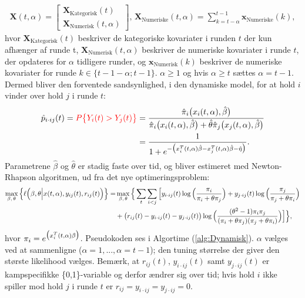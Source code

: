 \documentclass[11pt,a4paper]{article}
\begin{document}
\begin{align*}
\textbf{X}(t,\alpha)=\begin{bmatrix}
\textbf{X}_{\text{Kategorisk}}(t)\\
\textbf{X}_{\text{Numerisk}}(t,\alpha)
\end{bmatrix}\text{,   }\textbf{X}_{\text{Numeriske}}(t,\alpha)=\sum_{k=t-\alpha}^{t-1}\textbf{x}_{\text{Numeriske}}(k),
\end{align*}
hvor $\textbf{X}_{\text{Kategorisk}}(t)$ beskriver de kategoriske kovariater i runden $t$ der kun afhænger af runde t, $\textbf{X}_{\text{Numerisk}}(t,\alpha)$ beskriver de numeriske kovariater i runde $t$, der opdateres for $\alpha$ tidligere runder, og $\textbf{x}_{\text{Numerisk}}(k)$ beskriver de numeriske kovariater for runde $k\in \{t-1-\alpha;t-1\}$. $\alpha\geq1$ og hvis $\alpha\geq t$ sættes $\alpha=t-1$.
Dermed bliver den forventede sandsynlighed, i den dynamiske model, for at hold $i$ vinder over hold $j$ i runde $t$:
\begin{align*}
\hat{p}_{i\cdot ij}(t)=\textcolor{red}{P\big{\{}Y_{i}(t)>Y_{j}(t)\big{\}}}&=\frac{\hat{\pi}_i\big{(}x_i(t,\alpha),\hat{\beta}\big{)}}{\hat{\pi}_i\big{(}x_i(t,\alpha),\hat{\beta}\big{)}+\hat{\theta}\hat{\pi}_j\big{(}x_j(t,\alpha),\hat{\beta}\big{)}}\\
&=\frac{1}{1+e^{-\big{(}x_i^T(t,\alpha)\hat{\beta}-x_j^T(t,\alpha)\hat{\beta}-\hat{\eta}\big{)}}}.
\end{align*}
Parametrene $\hat{\beta}$ og $\hat{\theta}$ er stadig faste over tid, og bliver estimeret med Newton-Rhapson algoritmen, ud fra det nye optimeringsproblem:
\begin{align*}
\max_{\beta,\,\theta} \Big{\{}\ell\Big{(}\beta,\theta\Big{|}x(t,\alpha),y_{ij}(t),r_{ij}(t)\Big{)}\Big{\}}=&\max_{\beta,\,\theta} \Big{\{} \sum_{t}\sum_{i<j}\Big{[}y_{i\cdot ij}(t)\log\Big{(}\frac{\pi_i}{\pi_i+\theta\pi_j}\Big{)}
+ y_{j\cdot ij}(t)\log\Big{(}\frac{\pi_j}{\pi_j+\theta\pi_i}\Big{)}\\
&+ \big{(}r_{ij}(t)-y_{i\cdot ij}(t)-y_{j\cdot ij}(t)\big{)} \log\Big{(}\frac{(\theta^2-1)\pi_i \pi_j}{(\pi_i+\theta\pi_j)(\pi_j+\theta\pi_i)}\Big{)}\Big{]}\Big{\}},
\end{align*}
hvor $\pi_i=e^{\big{(}x_i^T(t,\alpha)\beta\big{)}}$. Pseudokoden ses i Algortime (\ref{alg:Dynamisk}). $\alpha$ vælges ved at sammenligne ($\alpha=1,...,\alpha=t-1$); den tuning størrelse der giver den største likelihood vælges. Bemærk, at $r_{ij}(t)$, $y_{i\cdot ij}(t)$ samt $y_{j\cdot ij}(t)$ er kampspecifikke \{0,1\}-variable og derfor ændrer sig over tid; hvis hold $i$ ikke spiller mod hold $j$ i runde $t$ er $r_{ij}=y_{i\cdot ij}=y_{j\cdot ij}=0$.\par
\end{document}
